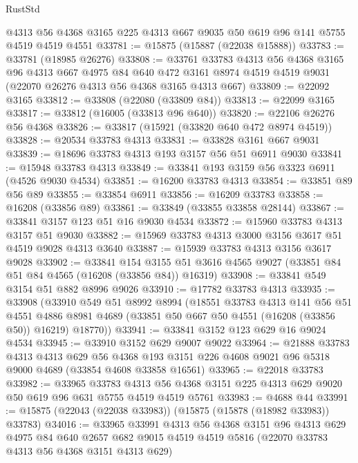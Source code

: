 \begin{lexlean}{RustStd}
\begin{coremodule}
    @4313
    @56
    @4368
    @3165
    @225
    @4313
    @667
    @9035
    @50
    @619
    @96
    @141
    @5755
    @4519
    @4519
    @4551
@33781 := @15875 (@15887 (@22038 @15888))
@33783 := @33781 (@18985 @26276)
@33808 := @33761
    @33783
    @4313
    @56
    @4368
    @3165
    @96
    @4313
    @667
    @4975
    @84
    @640
    @472
    @3161
    @8974
    @4519
    @4519
    @9031
    (@22070 @26276 @4313 @56 @4368 @3165 @4313 @667)
@33809 := @22092 @3165
@33812 := @33808 (@22080 (@33809 @84))
@33813 := @22099 @3165
@33817 := @33812 (@16005 (@33813 @96 @640))
@33820 := @22106 @26276 @56 @4368
@33826 := @33817 (@15921 (@33820 @640 @472 @8974 @4519))
@33828 := @20534 @33783 @4313
@33831 := @33828 @3161 @667 @9031
@33839 := @18696 @33783 @4313 @193 @3157 @56 @51 @6911 @9030
@33841 := @15948 @33783 @4313
@33849 := @33841 @193 @3159 @56 @3323 @6911 (@4526 @9030 @4534)
@33851 := @16200 @33783 @4313
@33854 := @33851 @89 @56 @89
@33855 := @33854 @6911
@33856 := @16209 @33783
@33858 := @16208 (@33856 @89)
@33861 := @33849 (@33855 @33858 @28144)
@33867 := @33841 @3157 @123 @51 @16 @9030 @4534
@33872 := @15960 @33783 @4313 @3157 @51 @9030
@33882 := @15969 @33783 @4313 @3000 @3156 @3617 @51 @4519 @9028 @4313 @3640
@33887 := @15939 @33783 @4313 @3156 @3617 @9028
@33902 := @33841
    @154
    @3155
    @51
    @3616
    @4565
    @9027
    (@33851 @84 @51 @84 @4565 (@16208 (@33856 @84)) @16319)
@33908 := @33841 @549 @3154 @51 @882 @8996 @9026
@33910 := @17782 @33783 @4313
@33935 := @33908
    (@33910
      @549
      @51
      @8992
      @8994
      (@18551
        @33783
        @4313
        @141
        @56
        @51
        @4551
        @4886
        @8981
        @4689
        (@33851 @50 @667 @50 @4551 (@16208 (@33856 @50)) @16219)
        @18770))
@33941 := @33841 @3152 @123 @629 @16 @9024 @4534
@33945 := @33910 @3152 @629 @9007 @9022
@33964 := @21888
    @33783
    @4313
    @4313
    @629
    @56
    @4368
    @193
    @3151
    @226
    @4608
    @9021
    @96
    @5318
    @9000
    @4689
    (@33854 @4608 @33858 @16561)
@33965 := @22018 @33783
@33982 := @33965
    @33783
    @4313
    @56
    @4368
    @3151
    @225
    @4313
    @629
    @9020
    @50
    @619
    @96
    @631
    @5755
    @4519
    @4519
    @5761
@33983 := @4688 @44
@33991 := @15875 (@22043 (@22038 @33983)) (@15875 (@15878 (@18982 @33983)) @33783)
@34016 := @33965
    @33991
    @4313
    @56
    @4368
    @3151
    @96
    @4313
    @629
    @4975
    @84
    @640
    @2657
    @682
    @9015
    @4519
    @4519
    @5816
    (@22070 @33783 @4313 @56 @4368 @3151 @4313 @629)

\end{coremodule}
\end{lexlean}
